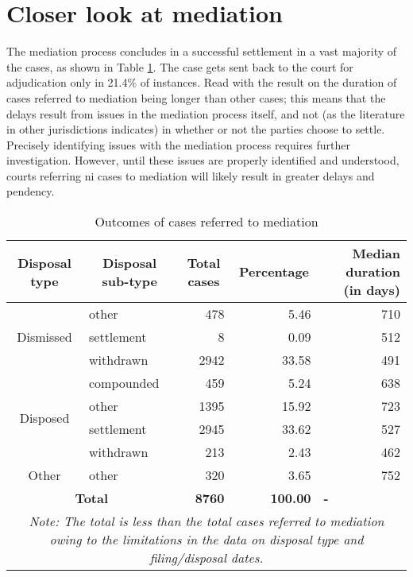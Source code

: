 \documentclass[11pt,a4paper]{article}
\begin{document}
\section{Closer look at mediation}
\label{sec:closer-look-at}

The mediation process concludes in a successful settlement in a vast majority of the cases, as shown in Table \ref{tab:mediation}. The case gets sent back to the court for adjudication only in 21.4\% of instances. Read with the result on the duration of cases referred to mediation being longer than other cases; this means that the delays result from issues in the mediation process itself, and not (as the literature in other jurisdictions indicates) in whether or not the parties choose to settle. Precisely identifying issues with the mediation process requires further investigation. However, until these issues are properly identified and understood, courts referring \gls{ni} cases to mediation will likely result in greater delays and pendency.

{\footnotesize \begin{longtable}{@{}clrrr@{}}
 \caption{Outcomes of cases referred to mediation}
 \label{tab:mediation}\\
 \toprule
 \textbf{Disposal type} & \multicolumn{1}{c}{\textbf{Disposal sub-type}} & \multicolumn{1}{c}{\textbf{Total cases}} & \multicolumn{1}{c}{\textbf{Percentage}} & \multicolumn{1}{p{3cm}}{\textbf{Median duration (in days)}} \\
 \midrule \endhead
 \multirow{3}{*}{Dismissed} & other & 478 & 5.46 & 710 \\
 & settlement & 8 & 0.09 & 512 \\
 & withdrawn & 2942 & 33.58 & 491 \\
 \midrule
 \multirow{4}{*}{Disposed} & compounded & 459 & 5.24 & 638 \\
 & other & 1395 & 15.92 & 723 \\
 & settlement & 2945 & 33.62 & 527 \\
 & withdrawn & 213 & 2.43 & 462 \\
 \midrule
 Other & other & 320 & 3.65 & 752 \\
 \midrule
 \multicolumn{2}{c}{\textbf{Total}} & \textbf{8760} & \textbf{100.00} & \multicolumn{1}{l}{\textbf{-}} \\
 \bottomrule \multicolumn{5}{p{11cm}}{{\footnotesize \emph{Note:
 The total is less than the total cases referred to mediation owing to the limitations in the data on disposal type and filing/disposal dates.}}}
 \end{longtable}}
\end{document}
